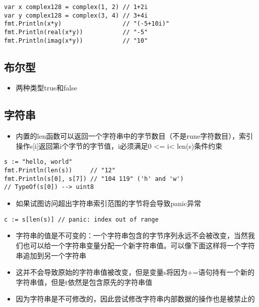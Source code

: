 \begin{verbatim}
var x complex128 = complex(1, 2) // 1+2i
var y complex128 = complex(3, 4) // 3+4i
fmt.Println(x*y)                 // "(-5+10i)"
fmt.Println(real(x*y))           // "-5"
fmt.Println(imag(x*y))           // "10"
\end{verbatim}

\hypertarget{ux5e03ux5c14ux578b}{%
\subsection{布尔型}\label{ux5e03ux5c14ux578b}}

\begin{itemize}
\tightlist
\item
  两种类型true和false
\end{itemize}

\hypertarget{ux5b57ux7b26ux4e32}{%
\subsection{字符串}\label{ux5b57ux7b26ux4e32}}

\begin{itemize}
\tightlist
\item
  内置的len函数可以返回一个字符串中的字节数目（不是rune字符数目），索引操作s{[}i{]}返回第i个字节的字节值，i必须满足0
  \textless{}= i\textless{} len(s)条件约束
\end{itemize}

\begin{verbatim}
s := "hello, world"
fmt.Println(len(s))     // "12"
fmt.Println(s[0], s[7]) // "104 119" ('h' and 'w')
// TypeOf(s[0]) --> uint8
\end{verbatim}

\begin{itemize}
\tightlist
\item
  如果试图访问超出字符串索引范围的字节将会导致panic异常
\end{itemize}

\begin{verbatim}
c := s[len(s)] // panic: index out of range
\end{verbatim}

\begin{itemize}
\tightlist
\item
  字符串的值是不可变的：一个字符串包含的字节序列永远不会被改变，当然我们也可以给一个字符串变量分配一个新字符串值。可以像下面这样将一个字符串追加到另一个字符串
\item
  这并不会导致原始的字符串值被改变，但是变量s将因为+=语句持有一个新的字符串值，但是t依然是包含原先的字符串值
\item
  因为字符串是不可修改的，因此尝试修改字符串内部数据的操作也是被禁止的
\end{itemize}

